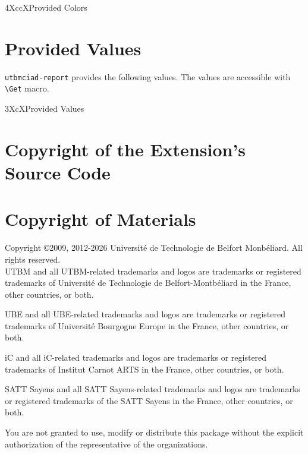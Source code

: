 \documentclass[article,nodocrefonfront,nodocrefonback]{utbmciadreport}
\gdef\upmextensiondoccolorlist{}
\gdef\upmextensiondocvaluelist{}
\begin{document}
\begin{mtabular}{4}{XccX}{Provided Colors}
\upmextensiondoccolorlist
\end{mtabular}

\section{Provided Values}

\texttt{utbmciad-report} provides the following values. The values are accessible with \texttt{{\textbackslash}Get} macro.

\begin{tiny}
\begin{mtabular}{3}{XcX}{Provided Values}
\upmextensiondocvaluelist
\end{mtabular}
\end{tiny}

\section{Copyright of the Extension's Source Code}



\section{Copyright of Materials}

Copyright \copyright 2009, 2012-2026 Universit\'e de Technologie de Belfort Monb\'eliard. All rights reserved. \\

UTBM and all UTBM-related trademarks and logos are trademarks or registered trademarks of Universit\'e de Technologie de Belfort-Montb\'eliard in the France, other countries, or both.

UBE and all UBE-related trademarks and logos are trademarks or registered trademarks of Universit\'e Bourgogne Europe in the France, other countries, or both.

iC and all iC-related trademarks and logos are trademarks or registered trademarks of Institut Carnot ARTS in the France, other countries, or both.

SATT Sayens and all SATT Sayens-related trademarks and logos are trademarks or registered trademarks of the SATT Sayens in the France, other countries, or both.

You are not granted to use, modify or distribute this package without the explicit authorization of the representative of the organizations.
\end{document}
